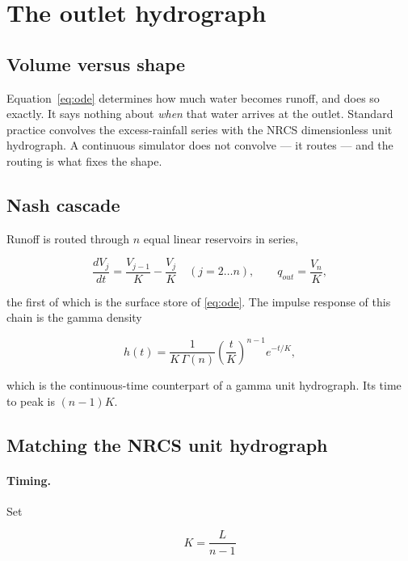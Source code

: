 \documentclass[11pt,a4paper]{article}
\begin{document}
\section{The outlet hydrograph}

\subsection{Volume versus shape}

Equation~\eqref{eq:ode} determines how much water becomes runoff, and does so
exactly. It says nothing about \emph{when} that water arrives at the outlet.
Standard practice convolves the excess-rainfall series with the NRCS
dimensionless unit hydrograph. A continuous simulator does not convolve --- it
routes --- and the routing is what fixes the shape.

\subsection{Nash cascade}

Runoff is routed through $n$ equal linear reservoirs in series,

\begin{equation}
\frac{dV_j}{dt}=\frac{V_{j-1}}{K}-\frac{V_j}{K}\quad (j=2\ldots n),
\qquad q_{out}=\frac{V_n}{K},
\end{equation}

\noindent
the first of which is the surface store of \eqref{eq:ode}. The impulse response
of this chain is the gamma density

\begin{equation}
h(t)=\frac{1}{K\,\Gamma(n)}\left(\frac{t}{K}\right)^{n-1}e^{-t/K},
\end{equation}

\noindent
which is the continuous-time counterpart of a gamma unit hydrograph. Its time
to peak is $(n-1)K$.

\subsection{Matching the NRCS unit hydrograph}

\paragraph{Timing.} Set

\begin{equation}
\boxed{\;K=\frac{L}{n-1}\;}
\end{equation}
\end{document}
